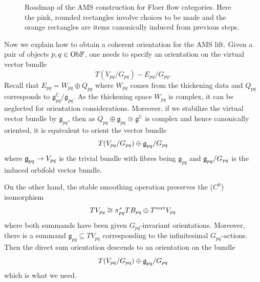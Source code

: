 \documentclass[reqno, 10pt]{amsart}
\numberwithin{equation}{section}
\numberwithin{equation}{section}
\renewcommand{\subset}{\subseteq}
\theoremstyle{definition}
\theoremstyle{remark}
\newcommand{\beqn}{\begin{equation*}}
\newcommand{\eeqn}{\end{equation*}}
\newcommand{\mb}{\mathbb}
\newcommand{\mf}{\mathfrak}
\renewcommand{\outer}{{}_{\lfloor}}
\newcommand{\uds}[1]{\underline{\smash{#1}}}
\begin{document}
\begin{center}
\begin{figure}[h]
\caption{Roadmap of the AMS construction  for Floer flow categories. Here the pink, rounded rectangles involve choices to be made and the orange rectangles are items canonically induced from previous steps.}\label{figure_roadmap}
\end{figure}
\end{center}

Now we explain how to obtain a coherent orientation for the AMS lift. Given a pair of objects $p, q \in {\rm Ob}{\mb F}$, one needs to specify an orientation on the virtual vector bundle
\beqn
T(V_{pq}/G_{pq}) - E_{pq}/G_{pq}.
\eeqn
Recall that $E_{pq} = W_{pq} \oplus Q_{pq}$ where $W_{pq}$ comes from the thickening data and $Q_{pq}$ corresponds to ${\mf g}_{pq}^{\mb C}/ {\mf g}_{pq}$. As the thickening space $W_{pq}$ is complex, it can be neglected for orientation considerations. Moreover, if we stabilize the virtual vector bundle by ${\mf g}_{pq}$, then as $Q_{pq} \oplus {\mf g}_{pq} \cong {\mf g}^{\mb C}$ is complex and hence canonically oriented, it is equivalent to orient the vector bundle
\beqn
T(V_{pq}/G_{pq}) \oplus \uds{\mf g}_{pq}/G_{pq}
\eeqn
where $\uds{\mf g}_{pq} \to V_{pq}$ is the trivial bundle with fibres being ${\mf g}_{pq}$ and $\uds{\mf g}_{pq}/G_{pq}$ is the induced orbifold vector bundle. 

On the other hand, the stable smoothing operation preserves the ($C^0$) isomorphism
\beqn
TV_{pq} \cong \pi_{pq}^* TB_{pq} \oplus T^{\rm vert} V_{pq}
\eeqn
where both summands have been given $G_{pq}$-invariant orientations. Moreover, there is a summand ${\mf g}_{pq} \subset TV_{pq}$ corresponding to the infinitesimal $G_{pq}$-actions. Then the direct sum orientation descends to an orientation on the bundle
\beqn
T(V_{pq}/G_{pq}) \oplus \uds{\mf g}_{pq}/G_{pq}
\eeqn
which is what we need.
\end{document}
